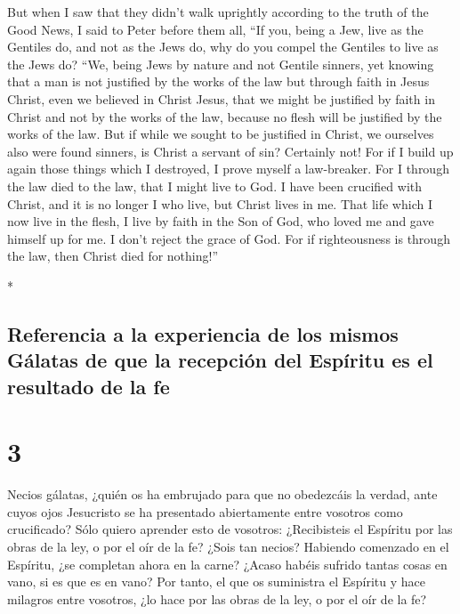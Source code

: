 \begin{paracol}{2}
\begin{otherlanguage}{english}
 But when I saw that they didn't walk uprightly according
to the truth of the Good News, I said to Peter before them all, ``If
you, being a Jew, live as the Gentiles do, and not as the Jews do, why
do you compel the Gentiles to live as the Jews do?  ``We,
being Jews by nature and not Gentile sinners,  yet
knowing that a man is not justified by the works of the law but through
faith in Jesus Christ, even we believed in Christ Jesus, that we might
be justified by faith in Christ and not by the works of the law, because
no flesh will be justified by the works of the law.  But
if while we sought to be justified in Christ, we ourselves also were
found sinners, is Christ a servant of sin? Certainly not!
 For if I build up again those things which I destroyed,
I prove myself a law-breaker.  For I through the law died
to the law, that I might live to God.  I have been
crucified with Christ, and it is no longer I who live, but Christ lives
in me. That life which I now live in the flesh, I live by faith in the
Son of God, who loved me and gave himself up for me.  I
don't reject the grace of God. For if righteousness is through the law,
then Christ died for nothing!''

\end{otherlanguage}

\switchcolumn[0]*

\hypertarget{referencia-a-la-experiencia-de-los-mismos-guxe1latas-de-que-la-recepciuxf3n-del-espuxedritu-es-el-resultado-de-la-fe}{%
\subsection{Referencia a la experiencia de los mismos Gálatas de que la
recepción del Espíritu es el resultado de la
fe}\label{referencia-a-la-experiencia-de-los-mismos-guxe1latas-de-que-la-recepciuxf3n-del-espuxedritu-es-el-resultado-de-la-fe}}

\hypertarget{section-4}{%
\section{3}\label{section-4}}

 Necios gálatas, ¿quién os ha embrujado para que no
obedezcáis la verdad, ante cuyos ojos Jesucristo se ha presentado
abiertamente entre vosotros como crucificado?  Sólo quiero
aprender esto de vosotros: ¿Recibisteis el Espíritu por las obras de la
ley, o por el oír de la fe?  ¿Sois tan necios? Habiendo
comenzado en el Espíritu, ¿se completan ahora en la carne?
 ¿Acaso habéis sufrido tantas cosas en vano, si es que es
en vano?  Por tanto, el que os suministra el Espíritu y
hace milagros entre vosotros, ¿lo hace por las obras de la ley, o por el
oír de la fe?


\end{paracol}
